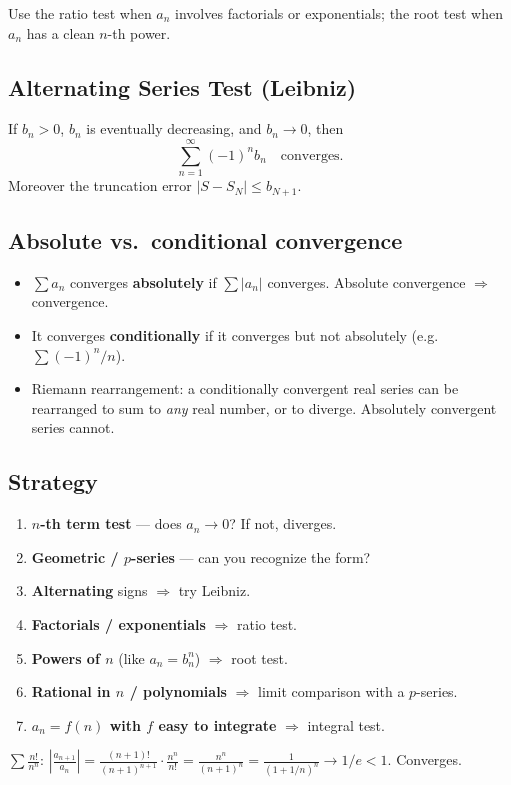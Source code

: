 \noindent Use the ratio test when $a_n$ involves factorials or exponentials;
the root test when $a_n$ has a clean $n$-th power.

\subsection{Alternating Series Test (Leibniz)}
\begin{theorem}
If $b_n > 0$, $b_n$ is eventually decreasing, and $b_n \to 0$, then
\[ \sum_{n=1}^\infty (-1)^{n} b_n \quad \text{converges.} \]
Moreover the truncation error $|S - S_N| \le b_{N+1}$.
\end{theorem}

\subsection{Absolute vs.\ conditional convergence}
\begin{itemize}[leftmargin=*,nosep]
  \item $\sum a_n$ converges \textbf{absolutely} if $\sum |a_n|$ converges. Absolute convergence
        $\Rightarrow$ convergence.
  \item It converges \textbf{conditionally} if it converges but not absolutely (e.g.\
        $\sum (-1)^n / n$).
  \item Riemann rearrangement: a conditionally convergent real series can be rearranged to sum to
        \emph{any} real number, or to diverge. Absolutely convergent series cannot.
\end{itemize}

\subsection{Strategy}
\begin{keybox}
\begin{enumerate}[leftmargin=*,nosep]
  \item \textbf{$n$-th term test} --- does $a_n \to 0$? If not, diverges.
  \item \textbf{Geometric / $p$-series} --- can you recognize the form?
  \item \textbf{Alternating} signs $\Rightarrow$ try Leibniz.
  \item \textbf{Factorials / exponentials} $\Rightarrow$ ratio test.
  \item \textbf{Powers of $n$} (like $a_n = b_n^n$) $\Rightarrow$ root test.
  \item \textbf{Rational in $n$ / polynomials} $\Rightarrow$ limit comparison with a $p$-series.
  \item \textbf{$a_n = f(n)$ with $f$ easy to integrate} $\Rightarrow$ integral test.
\end{enumerate}
\end{keybox}

\begin{example}
$\displaystyle \sum \frac{n!}{n^n}$:
$\left|\tfrac{a_{n+1}}{a_n}\right| = \tfrac{(n+1)!}{(n+1)^{n+1}} \cdot \tfrac{n^n}{n!}
= \tfrac{n^n}{(n+1)^n} = \tfrac{1}{(1+1/n)^n} \to 1/e < 1$. Converges.
\end{example}
